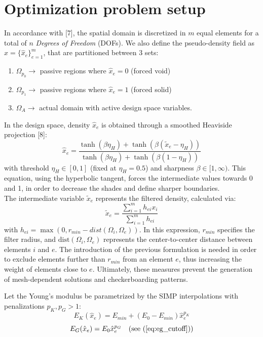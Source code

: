\documentclass{article}
\begin{document}
\section{Optimization problem setup}

\noindent In accordance with [7], the spatial domain is discretized in $m$ equal elements for a total of $n$ \textit{Degrees of Freedom} (DOFs). We also define the pseudo-density field as $\hat{x} = \{\hat{x}_e\}_{e=1}^m$, that are partitioned between 3 sets:
\begin{enumerate}
    \item $\Omega_{p_0} \rightarrow$ passive regions where $\hat{x}_e = 0$ (forced void)
    \item $\Omega_{p_1} \rightarrow$ passive regions where $\hat{x}_e = 1$ (forced solid)
    \item $\Omega_A \rightarrow$ actual domain with active design space variables.
\end{enumerate}

In the design space, density $\hat{x}_e$ is obtained through a smoothed Heaviside projection [8]:
\begin{equation}\label{eq:heaviside}
\hat{x}_e = \frac{\tanh(\beta\eta_H) + \tanh(\beta(\tilde{x}_e - \eta_H))}{\tanh(\beta\eta_H) + \tanh(\beta(1 - \eta_H))}
\end{equation}
\noindent with threshold $\eta_H \in [0, 1]$ (fixed at $\eta_H = 0.5$) and sharpness $\beta \in [1, \infty)$. This equation, using the hyperbolic tangent, forces the intermediate values towards 0 and 1, in order to decrease the shades and define sharper boundaries. \\
\noindent The intermediate variable $\tilde{x}_e$ represents the filtered density, calculated via:
\begin{equation}\label{eq:filter}
\tilde{x}_e = \frac{\sum_{i=1}^m h_{ei} x_i}{\sum_{i=1}^m h_{ei}}
\end{equation}
\noindent with $h_{ei} = \max(0, r_{min} - dist(\Omega_i, \Omega_e))$. In this expression, $r_{min}$ specifies the filter radius, and $\text{dist}(\Omega_i, \Omega_e)$ represents the center-to-center distance between elements $i$ and $e$. The introduction of the previous formulation is needed in order to exclude elements further than $r_{min}$ from an element $e$, thus increasing the weight of elements close to $e$. Ultimately, these measures prevent the generation of mesh-dependent solutions and checkerboarding patterns.

\vspace{\baselineskip}
Let the Young's modulus be parametrized by the SIMP interpolations with penalizations $p_K, p_G > 1$:
\begin{equation}\label{eq:simp_k}
E_K(\hat{x}_e) = E_{min} + (E_0 - E_{min})\hat{x}_e^{p_K}
\end{equation}
\begin{equation}\label{eq:simp_g}
E_G(\hat{x}_e) = E_0 \hat{x}_e^{p_G} \quad \text{(see (\ref{eq:eg_cutoff}))}
\end{equation}
\end{document}
